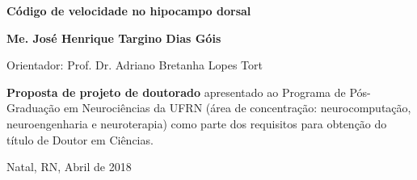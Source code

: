 \begin{titlepage}
\begin{center}
\vfill

\LARGE

\textbf{Código de velocidade no hipocampo dorsal}

\vfill

\Large

\textbf{Me. José Henrique Targino Dias Góis}

\vfill

\normalsize

Orientador: Prof. Dr. Adriano Bretanha Lopes Tort

\vfill

\hfill
\parbox{0.5\linewidth}{
	\textbf{Proposta de projeto de doutorado}
	apresentado ao Programa de Pós-Graduação em Neurociências da UFRN (área de concentração: neurocomputação, neuroengenharia e neuroterapia) como parte dos requisitos para obtenção do título de Doutor em Ciências.
}

\vfill

\large


Natal, RN, Abril de 2018

\end{center}

\end{titlepage}
